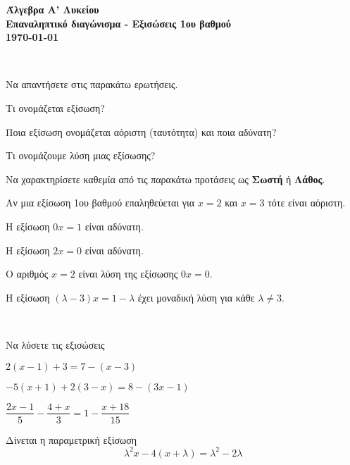 \documentclass[11pt,a4paper]{article}
\newcommand{\kerkissans}[1]{{\fontfamily{maksf}\selectfont \textbf{#1}}}
\begin{document}
\begin{center}
{\LARGE \kerkissans{Άλγεβρα Α' Λυκείου}}\\
{\large \kerkissans{Επαναληπτικό διαγώνισμα - Εξισώσεις 1ου βαθμού\\\today}}
\end{center}
\begin{thema}
\item\mbox{}\\\vspace{-5mm}
\begin{erwthma}
\item Να απαντήσετε στις παρακάτω ερωτήσεις.
\begin{alist}
\item Τι ονομάζεται εξίσωση?
\item Ποια εξίσωση ονομάζεται αόριστη (ταυτότητα) και ποια αδύνατη?
\item Τι ονομάζουμε λύση μιας εξίσωσης?
\end{alist}
\item Να χαρακτηρίσετε καθεμία από τις παρακάτω προτάσεις ως \textbf{Σωστή} ή \textbf{Λάθος}.
\begin{alist}
\item Αν μια εξίσωση 1ου βαθμού επαληθεύεται για $x=2$ και $x=3$ τότε είναι αόριστη.
\item Η εξίσωση $0x=1$ είναι αδύνατη.
\item Η εξίσωση $2x=0$ είναι αδύνατη.
\item Ο αριθμός $x=2$ είναι λύση της εξίσωσης $ 0x=0 $.
\item Η εξίσωση $(\lambda-3)x=1-\lambda$ έχει μοναδική λύση για κάθε $\lambda\neq 3$.
\end{alist}
\end{erwthma}
\item\mbox{}\\
\vspace{-7mm}
\begin{erwthma}
\item Να λύσετε τις εξισώσεις
\begin{alist}
\item $ 2(x-1)+3=7-(x-3) $
\item $ -5(x+1)+2(3-x)=8-(3x-1) $
\item $ \dfrac{2x-1}{5}-\dfrac{4+x}{3}=1-\dfrac{x+18}{15} $
\end{alist}
\end{erwthma}
\item Δίνεται η παραμετρική εξίσωση
\[ \lambda^2x-4(x+\lambda)=\lambda^2-2\lambda \]

\end{thema}
\end{document}
